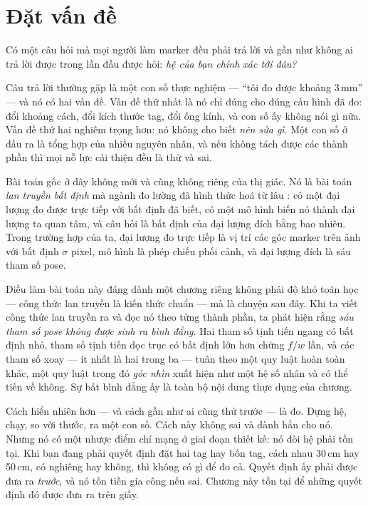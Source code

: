 \documentclass[../../marker.tex]{subfiles}
\begin{document}
\section{Đặt vấn đề}

Có một câu hỏi mà mọi người làm marker đều phải trả lời và gần như không ai trả lời được trong lần đầu được hỏi: \emph{hệ của bạn chính xác tới đâu?}

Câu trả lời thường gặp là một con số thực nghiệm --- ``tôi đo được khoảng 3\,mm'' --- và nó có hai vấn đề. Vấn đề thứ nhất là nó chỉ đúng cho đúng cấu hình đã đo: đổi khoảng cách, đổi kích thước tag, đổi ống kính, và con số ấy không nói gì nữa. Vấn đề thứ hai nghiêm trọng hơn: nó không cho biết \emph{nên sửa gì}. Một con số ở đầu ra là tổng hợp của nhiều nguyên nhân, và nếu không tách được các thành phần thì mọi nỗ lực cải thiện đều là thử và sai.

Bài toán gốc ở đây không mới và cũng không riêng của thị giác. Nó là bài toán \emph{lan truyền bất định} mà ngành đo lường đã hình thức hoá từ lâu \cite{jcgm2008gum}: có một đại lượng đo được trực tiếp với bất định đã biết, có một mô hình biến nó thành đại lượng ta quan tâm, và câu hỏi là bất định của đại lượng đích bằng bao nhiêu. Trong trường hợp của ta, đại lượng đo trực tiếp là vị trí các góc marker trên ảnh với bất định \(\sigma\) pixel, mô hình là phép chiếu phối cảnh, và đại lượng đích là sáu tham số pose.

Điều làm bài toán này đáng dành một chương riêng không phải độ khó toán học --- công thức lan truyền là kiến thức chuẩn \cite{haralick1998propagating,kanatani1996statistical} --- mà là chuyện sau đây. Khi ta viết công thức lan truyền ra và đọc nó theo từng thành phần, ta phát hiện rằng \emph{sáu tham số pose không được sinh ra bình đẳng}. Hai tham số tịnh tiến ngang có bất định nhỏ, tham số tịnh tiến dọc trục có bất định lớn hơn chừng \(f/w\) lần, và các tham số xoay --- ít nhất là hai trong ba --- tuân theo một quy luật hoàn toàn khác, một quy luật trong đó \emph{góc nhìn} xuất hiện như một hệ số nhân và có thể tiến về không. Sự bất bình đẳng ấy là toàn bộ nội dung thực dụng của chương.

Cách hiển nhiên hơn --- và cách gần như ai cũng thử trước --- là đo. Dựng hệ, chạy, so với thước, ra một con số. Cách này không sai và  dành hẳn cho nó. Nhưng nó có một nhược điểm chí mạng ở giai đoạn thiết kế: nó đòi hệ phải tồn tại. Khi bạn đang phải quyết định đặt hai tag hay bốn tag, cách nhau 30\,cm hay 50\,cm, có nghiêng hay không, thì không có gì để đo cả. Quyết định ấy phải được đưa ra \emph{trước}, và nó tốn tiền gia công nếu sai. Chương này tồn tại để những quyết định đó được đưa ra trên giấy.
\end{document}
